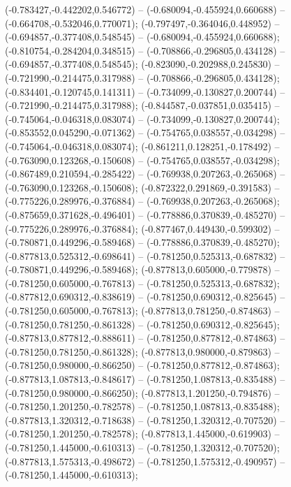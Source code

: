  (-0.783427,-0.442202,0.546772) -- (-0.680094,-0.455924,0.660688) -- (-0.664708,-0.532046,0.770071);
 (-0.797497,-0.364046,0.448952) -- (-0.694857,-0.377408,0.548545) -- (-0.680094,-0.455924,0.660688);
 (-0.810754,-0.284204,0.348515) -- (-0.708866,-0.296805,0.434128) -- (-0.694857,-0.377408,0.548545);
 (-0.823090,-0.202988,0.245830) -- (-0.721990,-0.214475,0.317988) -- (-0.708866,-0.296805,0.434128);
 (-0.834401,-0.120745,0.141311) -- (-0.734099,-0.130827,0.200744) -- (-0.721990,-0.214475,0.317988);
 (-0.844587,-0.037851,0.035415) -- (-0.745064,-0.046318,0.083074) -- (-0.734099,-0.130827,0.200744);
 (-0.853552,0.045290,-0.071362) -- (-0.754765,0.038557,-0.034298) -- (-0.745064,-0.046318,0.083074);
 (-0.861211,0.128251,-0.178492) -- (-0.763090,0.123268,-0.150608) -- (-0.754765,0.038557,-0.034298);
 (-0.867489,0.210594,-0.285422) -- (-0.769938,0.207263,-0.265068) -- (-0.763090,0.123268,-0.150608);
 (-0.872322,0.291869,-0.391583) -- (-0.775226,0.289976,-0.376884) -- (-0.769938,0.207263,-0.265068);
 (-0.875659,0.371628,-0.496401) -- (-0.778886,0.370839,-0.485270) -- (-0.775226,0.289976,-0.376884);
 (-0.877467,0.449430,-0.599302) -- (-0.780871,0.449296,-0.589468) -- (-0.778886,0.370839,-0.485270);
 (-0.877813,0.525312,-0.698641) -- (-0.781250,0.525313,-0.687832) -- (-0.780871,0.449296,-0.589468);
 (-0.877813,0.605000,-0.779878) -- (-0.781250,0.605000,-0.767813) -- (-0.781250,0.525313,-0.687832);
 (-0.877812,0.690312,-0.838619) -- (-0.781250,0.690312,-0.825645) -- (-0.781250,0.605000,-0.767813);
 (-0.877813,0.781250,-0.874863) -- (-0.781250,0.781250,-0.861328) -- (-0.781250,0.690312,-0.825645);
 (-0.877813,0.877812,-0.888611) -- (-0.781250,0.877812,-0.874863) -- (-0.781250,0.781250,-0.861328);
 (-0.877813,0.980000,-0.879863) -- (-0.781250,0.980000,-0.866250) -- (-0.781250,0.877812,-0.874863);
 (-0.877813,1.087813,-0.848617) -- (-0.781250,1.087813,-0.835488) -- (-0.781250,0.980000,-0.866250);
 (-0.877813,1.201250,-0.794876) -- (-0.781250,1.201250,-0.782578) -- (-0.781250,1.087813,-0.835488);
 (-0.877813,1.320312,-0.718638) -- (-0.781250,1.320312,-0.707520) -- (-0.781250,1.201250,-0.782578);
 (-0.877813,1.445000,-0.619903) -- (-0.781250,1.445000,-0.610313) -- (-0.781250,1.320312,-0.707520);
 (-0.877813,1.575313,-0.498672) -- (-0.781250,1.575312,-0.490957) -- (-0.781250,1.445000,-0.610313);
